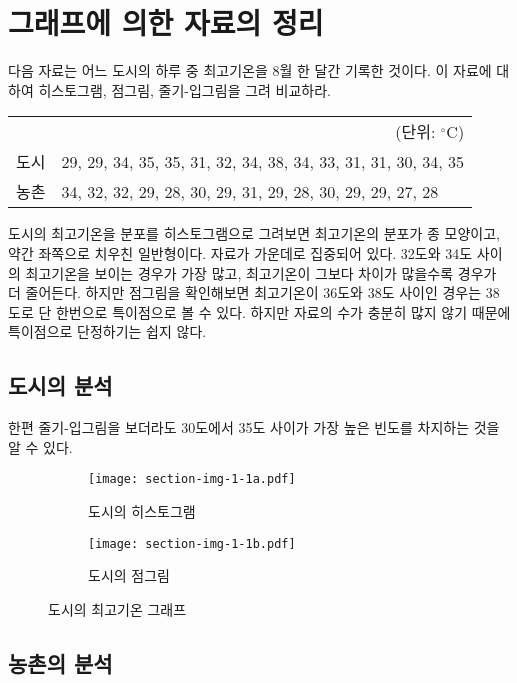 \section{그래프에 의한 자료의 정리}

다음 자료는 어느 도시의 하루 중 최고기온을 8월 한 달간 기록한 것이다.
이 자료에 대하여 히스토그램, 점그림, 줄기-입그림을 그려 비교하라.

\begin{tabularx}{0.9\textwidth}{ l|X }
  \multicolumn{2}{r}{\small(단위: $^{\circ}\mathrm{C}$)} \\
  \noalign{\smallskip}\hline\noalign{\smallskip}
  도시 &
  29, 29, 34, 35, 35, 31, 32, 34, 38, 34, 33, 31, 31, 30, 34, 35 \\
  농촌 &
  34, 32, 32, 29, 28, 30, 29, 31, 29, 28, 30, 29, 29, 27, 28 \\
\end{tabularx}

도시의 최고기온을 분포를 히스토그램으로 그려보면
최고기온의 분포가 종 모양이고, 약간 좌쪽으로 치우친 일반형이다.
자료가 가운데로 집중되어 있다. 32도와 34도 사이의 최고기온을 보이는 경우가 가장 많고,
최고기온이 그보다 차이가 많을수록 경우가 더 줄어든다. 하지만 점그림을 확인해보면
최고기온이 36도와 38도 사이인 경우는 38도로 단 한번으로 특이점으로 볼 수 있다.
하지만 자료의 수가 충분히 많지 않기 때문에 특이점으로 단정하기는 쉽지 않다.

\subsection{도시의 분석}


한편 줄기-입그림을 보더라도 30도에서 35도 사이가 가장 높은 빈도를 차지하는 것을
알 수 있다.

\begin{figure}[!hb]
  \begin{subfigure}{0.5\textwidth}
    \centering
    \texttt{[image: section-img-1-1a.pdf]}
    \caption{도시의 히스토그램}
  \end{subfigure}
  \begin{subfigure}{0.5\textwidth}
    \centering
    \texttt{[image: section-img-1-1b.pdf]}
    \caption{도시의 점그림}
  \end{subfigure}
  \caption{도시의 최고기온 그래프}
\end{figure}

\subsection{농촌의 분석}

